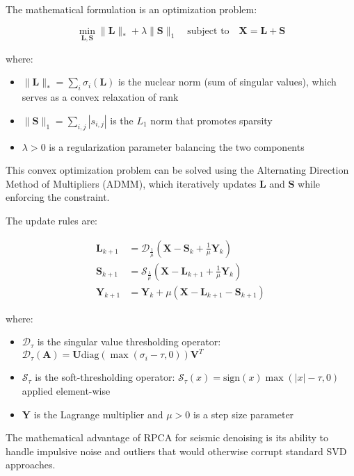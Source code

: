 \documentclass[10pt,twocolumn]{article}
\begin{document}
The mathematical formulation is an optimization problem:

\begin{equation}
\min_{\mathbf{L}, \mathbf{S}} \|\mathbf{L}\|_* + \lambda \|\mathbf{S}\|_1 \quad \text{subject to} \quad \mathbf{X} = \mathbf{L} + \mathbf{S}
\end{equation}

where:
\begin{itemize}
\item $\|\mathbf{L}\|_* = \sum_{i} \sigma_i(\mathbf{L})$ is the nuclear norm (sum of singular values), which serves as a convex relaxation of rank
\item $\|\mathbf{S}\|_1 = \sum_{i,j} |s_{i,j}|$ is the $L_1$ norm that promotes sparsity
\item $\lambda > 0$ is a regularization parameter balancing the two components
\end{itemize}

This convex optimization problem can be solved using the Alternating Direction Method of Multipliers (ADMM), which iteratively updates $\mathbf{L}$ and $\mathbf{S}$ while enforcing the constraint.

The update rules are:

\begin{align}
\mathbf{L}_{k+1} &= \mathcal{D}_{\frac{1}{\mu}}(\mathbf{X} - \mathbf{S}_k + \frac{1}{\mu}\mathbf{Y}_k) \\
\mathbf{S}_{k+1} &= \mathcal{S}_{\frac{\lambda}{\mu}}(\mathbf{X} - \mathbf{L}_{k+1} + \frac{1}{\mu}\mathbf{Y}_k) \\
\mathbf{Y}_{k+1} &= \mathbf{Y}_k + \mu(\mathbf{X} - \mathbf{L}_{k+1} - \mathbf{S}_{k+1})
\end{align}

where:
\begin{itemize}
\item $\mathcal{D}_{\tau}$ is the singular value thresholding operator: $\mathcal{D}_{\tau}(\mathbf{A}) = \mathbf{U}\text{diag}(\max(\sigma_i - \tau, 0))\mathbf{V}^T$
\item $\mathcal{S}_{\tau}$ is the soft-thresholding operator: $\mathcal{S}_{\tau}(x) = \text{sign}(x)\max(|x| - \tau, 0)$ applied element-wise
\item $\mathbf{Y}$ is the Lagrange multiplier and $\mu > 0$ is a step size parameter
\end{itemize}

The mathematical advantage of RPCA for seismic denoising is its ability to handle impulsive noise and outliers that would otherwise corrupt standard SVD approaches.
\end{document}
